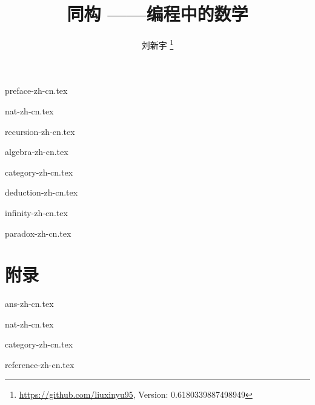 \documentclass[zihao=5, b5paper, twoside, table, heading=true, punct=kaiming]{ctexbook}
\begin{document}



\title{
  {\bf \Huge 同构 \newline}
  \vspace{5mm}
  {\bf ——编程中的数学 \newline \newline \newline}
  \centering
}

\author{刘新宇
  \thanks{ \url{https://github.com/liuxinyu95}, Version: 0.6180339887498949}
}

\maketitle

\frontmatter
{preface-zh-cn.tex}
\newpage

\tableofcontents

\mainmatter

{nat-zh-cn.tex}

{recursion-zh-cn.tex}

{algebra-zh-cn.tex}

{category-zh-cn.tex}

{deduction-zh-cn.tex}

{infinity-zh-cn.tex}

{paradox-zh-cn.tex}

\part*{附录}
\appendix
\noappendicestocpagenum
\addappheadtotoc

\backmatter
{ans-zh-cn.tex}

{nat-zh-cn.tex}

{category-zh-cn.tex}

{reference-zh-cn.tex}

\printindex

%
\end{document}
